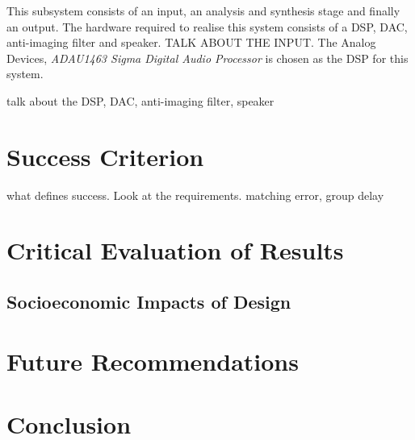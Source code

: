 \documentclass[12pt, onecolumn]{article}
\begin{document}
\noindent This subsystem consists of an input, an analysis and synthesis stage and finally an output. The hardware required to realise this system consists of a DSP, DAC, anti-imaging filter and speaker. TALK ABOUT THE INPUT. The Analog Devices, \textit{ADAU1463 Sigma Digital Audio Processor} is chosen as the DSP for this system.


talk about the DSP, DAC, anti-imaging filter, speaker




\section{Success Criterion}

what defines success. Look at the requirements. matching error, group delay

\section{Critical Evaluation of Results}



\subsection{Socioeconomic Impacts of Design}

\section{Future Recommendations}


\section{Conclusion}
\newpage
\printbibliography
\newpage
\end{document}

